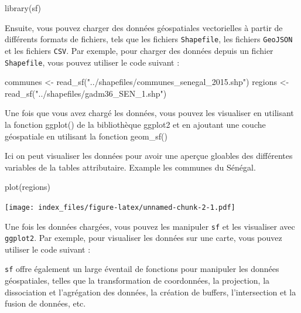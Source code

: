 \documentclass[
]{article}
\newenvironment{Shaded}{\begin{snugshade}}{\end{snugshade}}
\newcommand{\FunctionTok}[1]{\textcolor[rgb]{0.00,0.00,0.00}{#1}}
\newcommand{\NormalTok}[1]{#1}
\newcommand{\OtherTok}[1]{\textcolor[rgb]{0.56,0.35,0.01}{#1}}
\newcommand{\StringTok}[1]{\textcolor[rgb]{0.31,0.60,0.02}{#1}}
\begin{document}
\begin{Shaded}
\begin{Highlighting}[]
\FunctionTok{library}\NormalTok{(sf)}
\end{Highlighting}
\end{Shaded}

Ensuite, vous pouvez charger des données géospatiales vectorielles à
partir de différents formats de fichiers, tels que les fichiers
\texttt{Shapefile}, les fichiers \texttt{GeoJSON} et les fichiers
\texttt{CSV}. Par exemple, pour charger des données depuis un fichier
\texttt{Shapefile}, vous pouvez utiliser le code suivant :

\begin{Shaded}
\begin{Highlighting}[]
\NormalTok{communes }\OtherTok{\textless{}{-}} \FunctionTok{read\_sf}\NormalTok{(}\StringTok{"../shapefiles/communes\_senegal\_2015.shp"}\NormalTok{)}
\NormalTok{regions }\OtherTok{\textless{}{-}} \FunctionTok{read\_sf}\NormalTok{(}\StringTok{"../shapefiles/gadm36\_SEN\_1.shp"}\NormalTok{)}
\end{Highlighting}
\end{Shaded}

Une fois que vous avez chargé les données, vous pouvez les visualiser en
utilisant la fonction ggplot() de la bibliothèque ggplot2 et en ajoutant
une couche géospatiale en utilisant la fonction geom\_sf()

Ici on peut visualiser les données pour avoir une aperçue gloables des
différentes variables de la tables attributaire. Example les communes du
Sénégal.

\begin{Shaded}
\begin{Highlighting}[]
\FunctionTok{plot}\NormalTok{(regions)}
\end{Highlighting}
\end{Shaded}

\texttt{[image: index\_files/figure-latex/unnamed-chunk-2-1.pdf]}

Une fois les données chargées, vous pouvez les manipuler \texttt{sf} et
les visualiser avec \texttt{ggplot2}. Par exemple, pour visualiser les
données sur une carte, vous pouvez utiliser le code suivant :

\texttt{sf} offre également un large éventail de fonctions pour
manipuler les données géospatiales, telles que la transformation de
coordonnées, la projection, la dissociation et l'agrégation des données,
la création de buffers, l'intersection et la fusion de données, etc.
\end{document}
